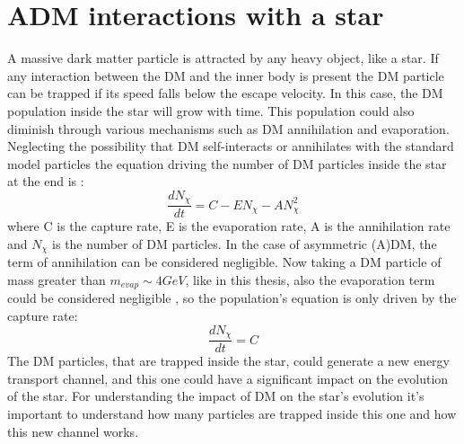 \section{ADM interactions with a star}
A massive dark matter particle is attracted by any heavy object, like a star. If any interaction between the DM and the inner body is present  the DM particle can be trapped if its speed falls below the escape velocity. In this case, the DM population inside the star will grow with time. This population could also diminish through various mechanisms such as DM annihilation and evaporation. Neglecting the possibility that DM self-interacts or annihilates with the standard model particles the equation driving the number of DM particles inside the star at the end is \cite{ReviewADM}:
\begin{equation*}
    \frac{d N_{\chi}}{dt}=C-EN_{\chi}-AN_{\chi}^2
\end{equation*}
where C is the capture rate, E is the evaporation rate, A is the annihilation rate and $N_{\chi}$ is the number of DM particles.
In the case of asymmetric (A)DM, the term of annihilation can be considered negligible.
Now taking a DM particle of mass greater than $m_{evap}\sim 4 GeV$, like in this thesis, also the evaporation term could be considered negligible \cite{DMSun}, so the population's equation is only driven by the capture rate:
\begin{equation*}
    \frac{d N_{\chi}}{dt}=C
\end{equation*}
The DM particles, that are trapped inside the star,  could generate a new energy transport channel, and this one could have a significant impact on the evolution of the star. For understanding the impact of DM on the star's evolution it's important to understand how many particles are trapped inside this one and how this new channel works.
